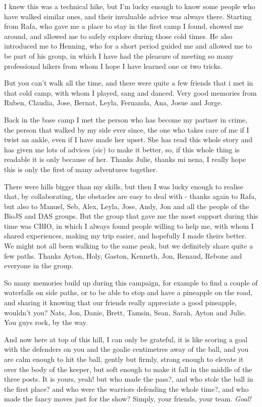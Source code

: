 \vspace{3mm}

I knew this was a technical hike, but I'm lucky enough to know some people who have walked similar ones, and their invaluable advice was always there. Starting from Rafa, who gave me a place to stay in the first camp I found, showed me around, and allowed me to safely explore during those cold times. He also introduced me to Henning, who for a short period guided me and allowed me to be part of his group, in which I have had the pleasure of meeting so many professional hikers from whom I hope I have learned one or two tricks.

But you can't walk all the time, and there were quite a few friends that i met in that cold camp, with whom I played, sang and danced. Very good memories from Ruben, Claudia, Jose, Bernat, Leyla, Fernanda, Ana, Josue and Jorge.

Back in the base camp I met the person who has become my partner in crime, the person that walked by my side ever since, the one who takes care of me if I twist an ankle, even if I have made her upset. She has read this whole story and has given me lots of advices (sic) to make it better, so, if this whole thing is readable it is only because of her. Thanks Julie, thanks mi nena, I really hope this is only the first of many adventures together.

\vspace{3mm}

There were hills bigger than my skills, but then I was lucky enough to realise that, by collaborating, the obstacles are easy to deal with - thanks again to Rafa, but also to Manuel, Seb, Alex, Leyla, Jose, Andy, Jon and all the people of the BioJS and DAS groups. But the group that gave me the most support during this time was CBIO, in which I always found people willing to help me, with whom I shared experiences, making my trip easier, and hopefully I made theirs better. We might not all been walking to the same peak, but we definitely share quite a few paths. Thanks Ayton, Holy, Gaston, Kenneth, Jon, Renaud, Rebone and everyone in the group.

So many memories build up during this campaign, for example to find a couple of waterfalls on side paths, or to be able to stop and have a pineapple on the road, and sharing it knowing that our friends really appreciate a good pineapple, wouldn't you? Nats, Jon, Danie, Brett, Tamsin, Sean, Sarah, Ayton and Julie. You guys rock, by the way.

\vspace{3mm}
And now here at top of this hill, I can only be grateful, it is like scoring a goal with the defenders on you and the goalie centimetres away of the ball, and you are calm enough to hit the ball, gently but firmly, strong enough to elevate it over the body of the keeper, but soft enough to make it fall in the middle of the three posts. It is yours, yeah! but who made the pass?, and who stole the ball in the first place? and who were the warriors defending the whole time?, and who made the fancy moves just for the show? Simply, your friends, your team. \emph{Goal!}
